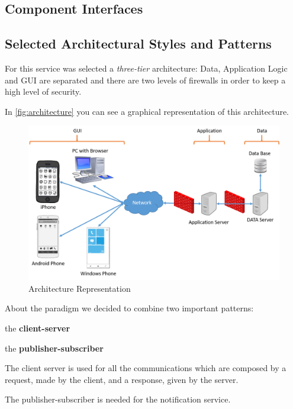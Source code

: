 \documentclass[a4paper]{article}
\begin{document}
\subsection{Component Interfaces}


\subsection{Selected Architectural Styles and Patterns}

For this service was selected a \emph{three-tier} architecture: Data, Application Logic and GUI are separated and there are two levels of firewalls in order to keep a high level of security.

In \autoref{fig:architecture} you can see a graphical representation of this architecture.

\nopagebreak

\begin{figure}[H]
\includegraphics[width=.9\textwidth]{Architecture}
\centering
\caption{Architecture Representation}
\label{fig:architecture}
\end{figure}

About the paradigm we decided to combine two important patterns: 
\begin{itemize*}
\item the \textbf{client-server}
\item the \textbf{publisher-subscriber}
\end{itemize*}

The client server is used for all the communications which are composed by a request, made by the client, and a response, given by the server.

The publisher-subscriber is needed for the notification service.
\end{document}
